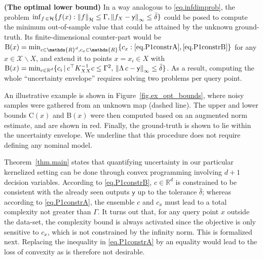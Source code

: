 \begin{remark}
	\textbf{(The optimal lower bound)}
	In a way analogous to \eqref{eq.infdimprob}, the problem $\inf_{f \, \in \mathcal{H}} \{ f(x) : \left\| f \right\|_\mathcal{H} \leq \Gamma, \left\| f_X - \mathsf{y} \right\|_\infty \leq \bar \delta \} $ could be posed to compute the minimum out-of-sample value that could be attained by the unknown ground-truth. Its finite-dimensional counter-part would be ${\normalfont \text{B}(x)} = \min_{c \in \mathds{R}^d, c_x \in \mathds{R}}  \{c_x : \eqref{eq.P1constrA}, \eqref{eq.P1constrB}\}$ for any $x \in \mathcal{X} \backslash X$, and extend it to points $x = x_i \in X$ with $\text{B}(x) = \min_{c \in \mathbb{R}^d} \{c_i \, | \, c^\top K_{XX}^{-1}c \leq \Gamma^2, \, \left\| \Lambda \, c - \mathsf{y} \right\|_\infty \leq \bar \delta \}$. As a result, computing the whole  ``uncertainty envelope'' requires solving two problems per query point.
\end{remark}

An illustrative example is shown in Figure~\ref{fig.ex_opt_bounds}, where noisy samples were gathered from an unknown map (dashed line). The upper and lower bounds C$(x)$ and B$(x)$ were then computed based on an augmented norm estimate, and are shown in red. Finally, the ground-truth is shown to lie within the uncertainty envelope. We underline that this procedure does not require defining any nominal model.

Theorem~\ref{thm.main} states that quantifying uncertainty in our particular kernelized setting can be done through convex programming involving $d+1$ decision variables. According to \eqref{eq.P1constrB}, $c \in \mathbb{R}^d$ is constrained to be consistent with the already seen outputs $\mathsf{y}$ up to the tolerance $\bar\delta$; whereas according to \eqref{eq.P1constrA}, the ensemble $c$ and $c_x$ must lead to a total complexity not greater than $\Gamma$. It turns out that, for any query point $x$ outside the data-set, the complexity bound is always activated since the objective is only sensitive to $c_x$, which is not constrained by the infinity norm. This is formalized next. Replacing the inequality in \eqref{eq.P1constrA} by an equality would lead to the loss of convexity as is therefore not desirable.

